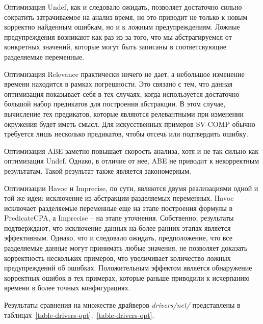 Оптимизация Undef, как и следовало ожидать, позволяет достаточно сильно сократить затрачиваемое на анализ время, но это приводит не только к новым корректно найденным ошибкам, но и к ложным предупреждениям.
Ложные предупреждения возникают как раз из-за того, что мы абстрагируемся от конкретных значений, которые могут быть записаны в соответсвующие разделяемые переменные. 

Оптимизация Relevance практически ничего не дает, а небольшое изменение времени находится в рамках погрешности. 
Это связано с тем, что данная оптимизация показывает себя в тех случаях, когда используется достаточно большой набор предикатов для построения абстракции.
В этом случае, вычисление тех предикатов, которые являются релевантными при изменении окружения будет иметь смысл.
Для искусственных примеров SV-COMP обычно требуется лишь несколько предикатов, чтобы отсечь или подтвердить ошибку.

Оптимизация ABE заметно повышает скорость анализа, хотя и не так сильно как оптимизация Undef. Однако, в отличие от нее, ABE не приводит к некорректным результатам. 
Такой результат также является закономерным.

Оптимизации Havoc и Imprecise, по сути, являются двумя реализациями одной и той же идеи: исключение из абстракции разделяемых переменных.
Havoc исключает разделяемые переменные еще на этапе построения формулы в PredicateCPA, а Imprecise -- на этапе уточнения.
Собственно, результаты подтверждают, что исключение данных на более ранних этапах является эффективным.
Однако, что и следовало ожидать, предположение, что все разделяемые данные могут принимать любые значения, не позволяет доказать корректность нескольких примеров, что увеличивает количество ложных предупреждений об ошибках.
Положительным эффектом является обнаружение корректных ошибок в тех примерах, которые раньше приводили к исчерпанию времени в более точных конфигурациях.

Результаты сравнения на множестве драйверов \textit{drivers/net/} представлены в таблицах~\ref{table-drivers-opt},~\ref{table-drivers-opt}.

